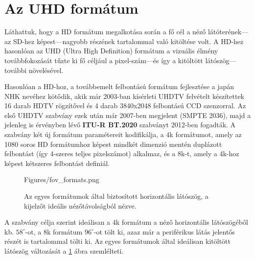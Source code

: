 \section{Az UHD formátum}

Láthattuk, hogy a HD formátum megalkotása során a fő cél a néző látóterének---az SD-hez képest---nagyobb részének tartalommal való kitöltése volt.
A HD-hez hasonlóan az UHD (Ultra High Definition) formátum a vizuális élmény továbbfokozását tűzte ki fő céljául a pixel-szám---és így a kitöltött látószög---további növelésével.

Hasonlóan a HD-hoz, a továbbemelt felbontású formátum fejlesztése a japán NHK nevéhez kötődik, akik már 2003-ban kísérleti UHDTV felvételt készítettek 16 darab HDTV rögzítővel és 4 darab 3840x2048 felbontású CCD szenzorral.
Az első UHDTV szabvány ezek után már 2007-ben megjelent (SMPTE 2036), majd a jelenleg is érvényben lévő \textbf{ITU-R BT.2020} szabványt 2012-ben fogadták.
A szabvány két új formátum paramétereit kodifikálja, a 4k formátumot, amely az 1080 soros HD formátumhoz képest mindkét dimenzió mentén duplázott felbontást (így 4-szeres teljes pixelszámot) alkalmaz, és a 8k-t, amely a 4k-hoz képest kétszeres felbontást definiál.
\begin{figure}[]
	\centering
	\begin{overpic}[width = 0.85 \columnwidth ]{Figures/fov_formats.png}
	\small
	\end{overpic}
	\caption{Az egyes formátumok által biztosított horizontális látószög, a kijelzőt ideális nézőtávolságból nézve.}
	\label{Fig:fov_formats}
\end{figure}

A szabvány célja szerint ideálisan a 4k formátum a néző horizontális látószögéből kb. $58^{\circ}$-ot, a 8k formátum $96^{\circ}$-ot tölt ki, azaz már a periférikus látás jelentős részét is tartalommal tölti ki.
Az egyes formátumok által ideálisan kitöltött látószög változását a \ref{Fig:fov_formats} ábra szemlélteti.

